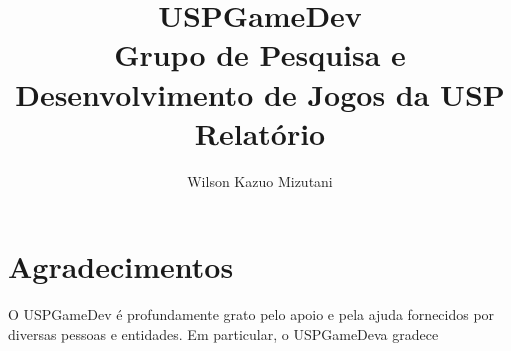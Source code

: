 \documentclass[12pt,onecolumn,a4paper]{article}
\begin{document}
\begin{titlepage}

    \title{
        \bf
        \Huge  USPGameDev \\
        \normalsize Grupo de Pesquisa e Desenvolvimento de Jogos da USP \\
        \LARGE Relatório
    }
    \author{Wilson Kazuo Mizutani}
    
    \maketitle
    
    \thispagestyle{empty}
    
\end{titlepage}


\tableofcontents

\clearpage

\pagestyle{myheadings}




\section{\LARGE Agradecimentos}

    O USPGameDev é profundamente grato pelo apoio e pela ajuda fornecidos por diversas pessoas e
    entidades. Em particular, o USPGameDeva gradece
    
\end{document}
